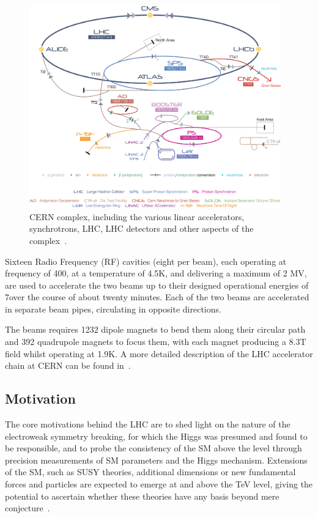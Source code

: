 \begin{figure}[htbp]
\begin{center}
\includegraphics[width=0.97\textwidth]{figs/lhc/Cern-Accelerator-Complex.jpg}
\caption{CERN complex, including the various linear accelerators, synchrotrons, LHC, LHC detectors and other aspects of the complex~\cite{Marcastel:1621583}.}
\label{fig:cern-accelerator-complex}
\end{center}
\end{figure}

Sixteen Radio Frequency (RF) cavities (eight per beam), each operating at frequency of 400\MHz, at a temperature of 4.5K, and delivering a maximum of 2 MV, are used to accelerate the two beams up to their designed operational energies of 7\TeV over the course of about twenty minutes.
Each of the two beams are accelerated in separate beam pipes, circulating in opposite directions.

The beams requires 1232 dipole magnets to bend them along their circular path and 392 quadrupole magnets to focus them, with each magnet producing a 8.3T field whilst operating at 1.9K.
A more detailed description of the LHC accelerator chain at CERN can be found in~\cite{Schindl:397574}. 

\subsection{Motivation}\label{subsec:lhcMotivation}
The core motivations behind the LHC are to shed light on the nature of the electroweak symmetry breaking,  for which the Higgs was presumed and found to be responsible, and to probe the consistency of the SM above the \TeV level through precision measurements of SM parameters and the Higgs mechanism.
Extensions of the SM, such as SUSY theories, additional dimensions or new fundamental forces and particles are expected to emerge at and above the TeV level, giving the potential to ascertain whether these theories have any basis beyond mere conjecture~\cite{Bayatian:2006zz}.

